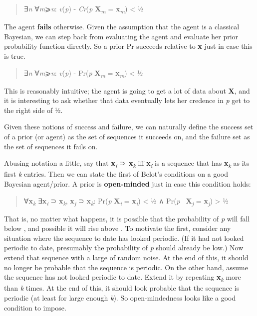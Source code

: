 \documentclass[
  11pt,
  letterpaper,
  DIV=11,
  numbers=noendperiod,
  twoside]{scrartcl}
\begin{document}
\begin{quote}
∃\emph{n} ∀\emph{m}⩾\emph{n}: \textbar{}\emph{v}(\emph{p}) -
\emph{Cr}(\emph{p} \textbar{} \textbf{X}\textsubscript{\emph{m}} =
\textbf{x}\textsubscript{\emph{m}})\textbar{} \textless{} ½
\end{quote}

The agent \textbf{fails} otherwise. Given the assumption that the agent
is a classical Bayesian, we can step back from evaluating the agent and
evaluate her prior probability function directly. So a prior Pr succeeds
relative to \textbf{x} just in case this is true.

\begin{quote}
∃\emph{n} ∀\emph{m}⩾\emph{n}: \textbar{}\emph{v}(\emph{p}) - Pr(\emph{p}
\textbar{} \textbf{X}\textsubscript{\emph{m}} =
\textbf{x}\textsubscript{\emph{m}})\textbar{} \textless{} ½
\end{quote}

This is reasonably intuitive; the agent is going to get a lot of data
about \textbf{X}, and it is interesting to ask whether that data
eventually lets her credence in \emph{p} get to the right side of ½.

Given these notions of success and failure, we can naturally define the
success set of a prior (or agent) as the set of sequences it succeeds
on, and the failure set as the set of sequences it fails on.

Abusing notation a little, say that \textbf{x}\textsubscript{\emph{i}}
⊃~\textbf{x}\textsubscript{\emph{k}} iff
\textbf{x}\textsubscript{\emph{i}} is a sequence that has
\textbf{x}\textsubscript{\emph{k}} as its first \emph{k} entries. Then
we can state the first of Belot's conditions on a good Bayesian
agent/prior. A prior is \textbf{open-minded} just in case this condition
holds:

\begin{quote}
∀\textbf{x}\textsubscript{\emph{k}} ∃\textbf{x}\textsubscript{\emph{i}}
⊃ \textbf{x}\textsubscript{\emph{k}}, \textbf{x}\textsubscript{\emph{j}}
⊃ \textbf{x}\textsubscript{\emph{k}}: Pr(\emph{p} \textbar{}
\textbf{X}\textsubscript{\emph{i}} = \textbf{x}\textsubscript{\emph{i}})
\textless{} ½ ∧ Pr(\emph{p}~\textbar{}
\textbf{X}\textsubscript{\emph{j}} = \textbf{x}\textsubscript{\emph{j}})
\textgreater{} ½
\end{quote}

That is, no matter what happens, it is possible that the probability of
\emph{p} will fall below , and possible it will rise above . To motivate
the first, consider any situation where the sequence to date has looked
periodic. (If it had not looked periodic to date, presumably the
probability of \emph{p} should already be low.) Now extend that sequence
with a large of random noise. At the end of this, it should no longer be
probable that the sequence is periodic. On the other hand, assume the
sequence has not looked periodic to date. Extend it by repeating
\textbf{x}\textsubscript{\emph{k}} more than \emph{k} times. At the end
of this, it should look probable that the sequence is periodic (at least
for large enough \emph{k}). So open-mindedness looks like a good
condition to impose.
\end{document}
